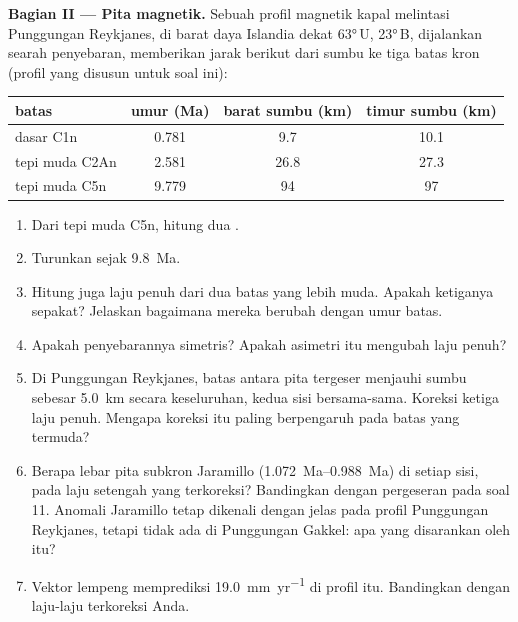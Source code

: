 \begin{problem}
\noindent\textbf{Bagian II --- Pita magnetik.}
Sebuah profil magnetik kapal melintasi Punggungan Reykjanes, di barat daya Islandia dekat \ang{63}\,U, \ang{23}\,B, dijalankan searah penyebaran, memberikan jarak berikut dari sumbu ke tiga batas kron (profil yang disusun untuk soal ini):
\begin{center}\small
\begin{tabular}{lccc}
\hline
batas & umur (Ma) & barat sumbu (km) & timur sumbu (km)\\
\hline
dasar C1n & 0.781 & 9.7 & 10.1\\
tepi muda C2An & 2.581 & 26.8 & 27.3\\
tepi muda C5n & 9.779 & 94 & 97\\
\hline
\end{tabular}
\end{center}
\begin{enumerate}[resume]
  \item Dari tepi muda C5n, hitung dua .
  \item Turunkan  sejak \qty{9.8}{Ma}.
  \item Hitung juga laju penuh dari dua batas yang lebih muda. Apakah ketiganya sepakat? Jelaskan bagaimana mereka berubah dengan umur batas.
  \item Apakah penyebarannya simetris? Apakah asimetri itu mengubah laju penuh?
  \item Di Punggungan Reykjanes, batas antara pita tergeser menjauhi sumbu sebesar \qty{5.0}{km} secara keseluruhan, kedua sisi bersama-sama. Koreksi ketiga laju penuh. Mengapa koreksi itu paling berpengaruh pada batas yang termuda?
  \item Berapa lebar pita subkron Jaramillo (\qtyrange{1.072}{0.988}{Ma}) di setiap sisi, pada laju setengah yang terkoreksi? Bandingkan dengan pergeseran pada soal 11. Anomali Jaramillo tetap dikenali dengan jelas pada profil Punggungan Reykjanes, tetapi tidak ada di Punggungan Gakkel: apa yang disarankan oleh itu?
  \item Vektor lempeng memprediksi \qty{19.0}{mm.yr^{-1}} di profil itu. Bandingkan dengan laju-laju terkoreksi Anda.
\end{enumerate}


\end{problem}
